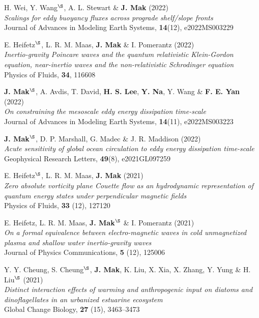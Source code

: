 \documentclass[letterpaper]{article}
\renewenvironment{itemize}{
  \begin{list}{}{
    \setlength{\leftmargin}{1.5em}
  }
}{
  \end{list}
}
\begin{document}
\begin{itemize}
\item[16.] H. Wei, Y. Wang$^{\S}$, A. L. Stewart \& \textbf{J. Mak}
(2022)\\
\textit{Scalings for eddy buoyancy fluxes across prograde shelf/slope fronts}\\
Journal of Advances in Modeling Earth Systems, \textbf{14}(12), e2022MS003229

\item[15.] E. Heifetz$^{\S}$, L. R. M. Maas, \textbf{J. Mak} \& I. Pomerantz (2022)\\
\textit{Inertio-gravity Poincare waves and the quantum relativistic Klein-Gordon equation, near-inertio waves and the non-relativistic Schrodinger equation}\\
Physics of Fluids, \textbf{34}, 116608

\item[14.] \textbf{J. Mak}$^{\S}$, A. Avdis, T. David, \textbf{H. S. Lee}, \textbf{Y. Na}, Y. Wang \& \textbf{F. E. Yan} (2022)\\
\textit{On constraining the mesoscale eddy energy dissipation time-scale}\\
Journal of Advances in Modeling Earth Systems, \textbf{14}(11), e2022MS003223

\item[13.] \textbf{J. Mak}$^{\S}$, D. P. Marshall, G. Madec \& J. R. Maddison (2022)\\
\textit{Acute sensitivity of global ocean circulation to eddy energy dissipation time-scale}\\
Geophysical Research Letters, \textbf{49}(8), e2021GL097259

\item[12.] E. Heifetz$^{\S}$, L. R. M. Maas, \textbf{J. Mak} (2021)\\
\textit{Zero absolute vorticity plane Couette flow as an hydrodynamic representation of quantum energy states under perpendicular magnetic fields}\\
Physics of Fluids, \textbf{33} (12), 127120

\item[11.] E. Heifetz, L. R. M. Maas, \textbf{J. Mak}$^{\S}$ \& I. Pomerantz (2021)\\
\textit{On a formal equivalence between electro-magnetic waves in cold unmagnetized plasma and shallow water inertio-gravity waves}\\
Journal of Physics Communications, \textbf{5} (12), 125006

\item[10.] Y. Y. Cheung, S. Cheung$^{\S}$, \textbf{J. Mak}, K. Liu, X. Xia, X. Zhang, Y. Yung \& H. Liu$^{\S}$ (2021)\\
\textit{Distinct interaction effects of warming and anthropogenic input on
diatoms and dinoflagellates in an urbanized estuarine ecosystem}\\
Global Change Biology, \textbf{27} (15), 3463--3473


\end{itemize}
\end{document}
